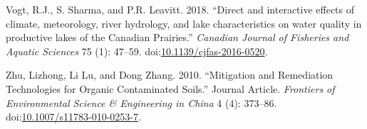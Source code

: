 \documentclass[fleqn,10pt]{wlpeerj} %
\begin{document}
\hypertarget{ref-Vogt2018}{}
Vogt, R.J., S. Sharma, and P.R. Leavitt. 2018. ``Direct and interactive
effects of climate, meteorology, river hydrology, and lake
characteristics on water quality in productive lakes of the Canadian
Prairies.'' \emph{Canadian Journal of Fisheries and Aquatic Sciences} 75
(1): 47--59.
doi:\href{https://doi.org/10.1139/cjfas-2016-0520}{10.1139/cjfas-2016-0520}.

\hypertarget{ref-Zhu2010}{}
Zhu, Lizhong, Li Lu, and Dong Zhang. 2010. ``Mitigation and Remediation
Technologies for Organic Contaminated Soils.'' Journal Article.
\emph{Frontiers of Environmental Science \& Engineering in China} 4 (4):
373--86.
doi:\href{https://doi.org/10.1007/s11783-010-0253-7}{10.1007/s11783-010-0253-7}.
\end{document}
